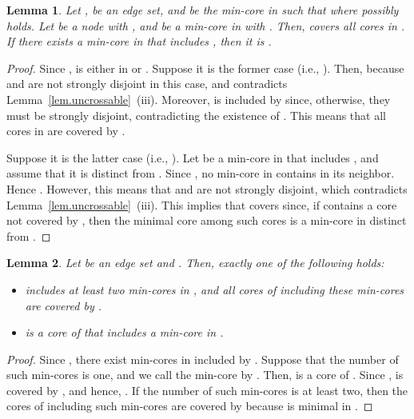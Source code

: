 \documentclass[11pt]{article}
\newtheorem{lemma}{Lemma}
\begin{document}
\begin{lemma}\label{lem.neighbor}
 Let ,  be an edge set, and  be the
 min-core in  
 such that  where  possibly holds.
 Let  be a node with
 ,
 and  be a min-core in  with .
 Then,  covers all cores in . If there exists a min-core in
  that includes , then it is .
\end{lemma}
\begin{proof}
 Since ,
  is either in  or .
 Suppose it is the former case (i.e., ). Then,  
 because  and  are not strongly disjoint in this case,
 and 
 contradicts Lemma~\ref{lem.uncrossable}~(iii).
 Moreover,  is
 included by  
 since, otherwise, they must be strongly disjoint, contradicting the
 existence of .
 This means that all cores
 in  are covered by .

 Suppose it is the latter case (i.e., ). 
 Let  be a min-core in  that includes , and
 assume that it is distinct from .
 Since , no min-core
 in  contains  in its neighbor.
 Hence .
 However, this means that 
  and  are not strongly disjoint, which contradicts
 Lemma~\ref{lem.uncrossable}~(iii).
 This implies that  covers  since,
 if  contains a core not covered by , then
 the minimal core among such cores is a min-core in  distinct
 from .
\end{proof}


\begin{lemma}\label{lem.newcore}
 Let  be an edge set and .
 Then, exactly one of the following holds\/{\rm :}
\begin{itemize}
 \item  includes at least two min-cores in ,
       and all cores of  including these min-cores are covered by
       \/.
 \item  is a core of  that includes 
       a min-core in .
\end{itemize}
\end{lemma}
\begin{proof}
 Since , there exist min-cores in 
 included by . Suppose that the number of such min-cores is
 one, and we call the min-core by . Then,
  is a core of .
 Since ,  is covered by , and hence,
 .
 If the number of such min-cores is at least two, 
 then the cores of  including such min-cores are covered by 
 because  is minimal in .
\end{proof}
\end{document}
